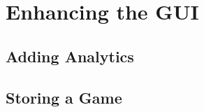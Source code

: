 \chapter{Enhancing the GUI}

\section{Adding Analytics}\label{sec:analytics}

\section{Storing a Game}\label{sec:storing}
